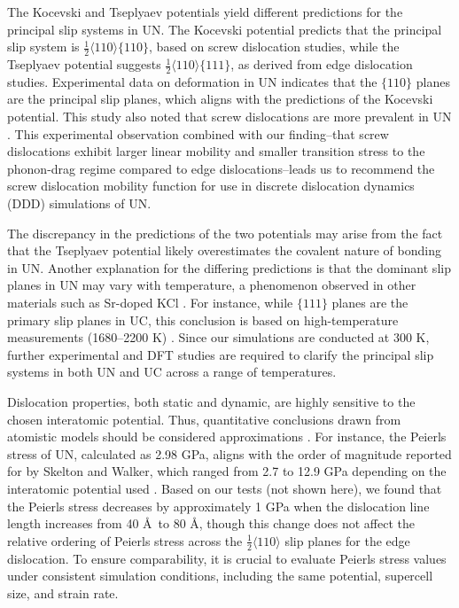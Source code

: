 \documentclass[applsci,article,submit,pdftex,moreauthors]{Definitions/mdpi}
\newcommand{\?}{\stackrel{?}{=}}
\begin{document}
The Kocevski and Tseplyaev potentials yield different predictions for the principal slip systems in UN. The Kocevski potential predicts that the principal slip system is $\frac{1}{2} \langle 110 \rangle \{110\}$, based on screw dislocation studies, while the Tseplyaev potential suggests $\frac{1}{2} \langle 110 \rangle \{111\}$, as derived from edge dislocation studies. Experimental data \cite{Sole1968} on deformation in UN indicates that the $\{110\}$ planes are the principal slip planes, which aligns with the predictions of the Kocevski potential. This study also noted that screw dislocations are more prevalent in UN \cite{Sole1968}. This experimental observation combined with our finding--that screw dislocations exhibit larger linear mobility and smaller transition stress to the phonon-drag regime compared to edge dislocations--leads us to recommend the screw dislocation mobility function for use in discrete dislocation dynamics (DDD) simulations of UN.

The discrepancy in the predictions of the two potentials may arise from the fact that the Tseplyaev potential likely overestimates the covalent nature of bonding in UN. Another explanation for the differing predictions is that the dominant slip planes in UN may vary with temperature, a phenomenon observed in other materials such as Sr-doped KCl \cite{Haasen1985}. For instance, while $\{111\}$ planes are the primary slip planes in UC, this conclusion is based on high-temperature measurements (1680--2200 K) \cite{Vasudevamurthy2022}. Since our simulations are conducted at 300 K, further experimental and DFT studies are required to clarify the principal slip systems in both UN and UC across a range of temperatures.

Dislocation properties, both static and dynamic, are highly sensitive to the chosen interatomic potential. Thus, quantitative conclusions drawn from atomistic models should be considered approximations \cite{Puls1976, Liu2012}. For instance, the Peierls stress of UN, calculated as 2.98 GPa, aligns with the order of magnitude reported for  by Skelton and Walker, which ranged from 2.7 to 12.9 GPa depending on the interatomic potential used \cite{Skelton2017}. Based on our tests (not shown here), we found that the Peierls stress decreases by approximately 1 GPa when the dislocation line length increases from 40 \AA\ to 80 \AA, though this change does not affect the relative ordering of Peierls stress across the $\frac{1}{2}\langle110\rangle$ slip planes for the edge dislocation. To ensure comparability, it is crucial to evaluate Peierls stress values under consistent simulation conditions, including the same potential, supercell size, and strain rate.
\end{document}
